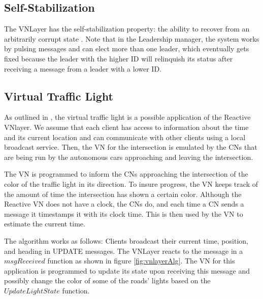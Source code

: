 \documentclass[12pt]{article}
\begin{document}
\subsection{Self-Stabilization}
The VNLayer has the self-stabilization property:  the ability to recover from an arbitrarily corrupt state \cite{ssvnlayer}.  Note that in the Leadership manager, the system works by pulsing messages and can elect more than one leader, which eventually gets fixed because the leader with the higher ID will relinquish its status after receiving a message from a leader with a lower ID. 
\subsection{Virtual Traffic Light}
As outlined in \cite{vnlayer}, the virtual traffic light is a possible application of the Reactive VNlayer.  We assume that each client has access to information about the time and its current location and can communicate with other clients using a local broadcast service. Then, the VN for the intersection is emulated by the CNs that are being run by the autonomous cars approaching and leaving the intersection. 

The VN is programmed to inform the CNs approaching the intersection of the color of the traffic light in its direction.  To insure progress, the VN keeps track of the amount of time the intersection has shown a certain color.  Although the Reactive VN does not have a clock, the CNs do, and each time a CN sends a message it timestamps it with its clock time.  This is then used by the VN to estimate the current time.   

The algorithm works as follows:  Clients broadcast their current time, position, and heading in UPDATE messages.  The VNLayer reacts to the message in a $msgReceived$ function as shown in figure \ref{fig:vnlayerAlg}.  The VN for this application is programmed to update its state upon receiving this message and possibly change the color of some of the roads' lights based on the $UpdateLightState$ function. 
\end{document}

